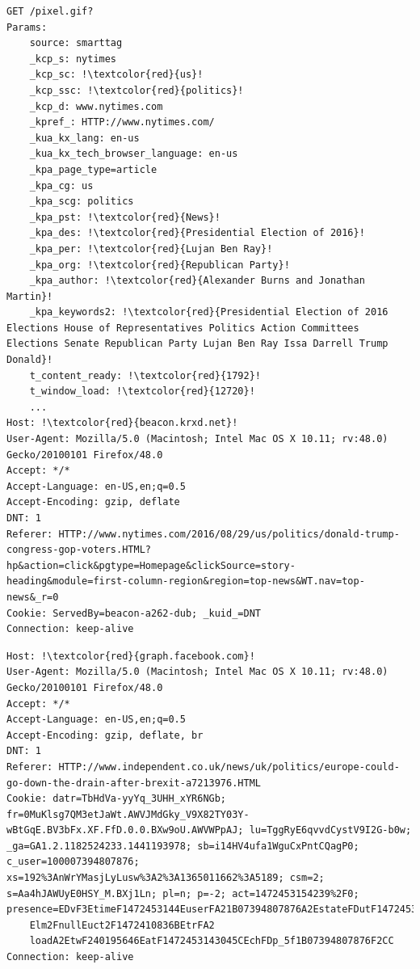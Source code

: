 \begin{lstlisting}[frame=single, breaklines=true, keepspaces=true, basicstyle=\tiny, escapechar=!]
GET /pixel.gif?
Params:
	source: smarttag
	_kcp_s: nytimes
	_kcp_sc: !\textcolor{red}{us}!
	_kcp_ssc: !\textcolor{red}{politics}!
	_kcp_d: www.nytimes.com
	_kpref_: HTTP://www.nytimes.com/
	_kua_kx_lang: en-us
	_kua_kx_tech_browser_language: en-us
	_kpa_page_type=article
	_kpa_cg: us
	_kpa_scg: politics
	_kpa_pst: !\textcolor{red}{News}!
	_kpa_des: !\textcolor{red}{Presidential Election of 2016}!
	_kpa_per: !\textcolor{red}{Lujan Ben Ray}!
	_kpa_org: !\textcolor{red}{Republican Party}!
	_kpa_author: !\textcolor{red}{Alexander Burns and Jonathan Martin}!
	_kpa_keywords2: !\textcolor{red}{Presidential Election of 2016 Elections House of Representatives Politics Action Committees Elections Senate Republican Party Lujan Ben Ray Issa Darrell Trump Donald}!
	t_content_ready: !\textcolor{red}{1792}!
	t_window_load: !\textcolor{red}{12720}!
	...
Host: !\textcolor{red}{beacon.krxd.net}!
User-Agent: Mozilla/5.0 (Macintosh; Intel Mac OS X 10.11; rv:48.0) Gecko/20100101 Firefox/48.0
Accept: */*
Accept-Language: en-US,en;q=0.5
Accept-Encoding: gzip, deflate
DNT: 1
Referer: HTTP://www.nytimes.com/2016/08/29/us/politics/donald-trump-congress-gop-voters.HTML?hp&action=click&pgtype=Homepage&clickSource=story-heading&module=first-column-region&region=top-news&WT.nav=top-news&_r=0
Cookie: ServedBy=beacon-a262-dub; _kuid_=DNT
Connection: keep-alive
\end{lstlisting}

\begin{lstlisting}[frame=single, breaklines=true, keepspaces=true, basicstyle=\tiny, escapechar=!]
Host: !\textcolor{red}{graph.facebook.com}!
User-Agent: Mozilla/5.0 (Macintosh; Intel Mac OS X 10.11; rv:48.0) Gecko/20100101 Firefox/48.0
Accept: */*
Accept-Language: en-US,en;q=0.5
Accept-Encoding: gzip, deflate, br
DNT: 1
Referer: HTTP://www.independent.co.uk/news/uk/politics/europe-could-go-down-the-drain-after-brexit-a7213976.HTML
Cookie: datr=TbHdVa-yyYq_3UHH_xYR6NGb; fr=0MuKlsg7QM3etJaWt.AWVJMdGky_V9X82TY03Y-wBtGqE.BV3bFx.XF.FfD.0.0.BXw9oU.AWVWPpAJ; lu=TggRyE6qvvdCystV9I2G-b0w; _ga=GA1.2.1182524233.1441193978; sb=i14HV4ufa1WguCxPntCQagP0; c_user=100007394807876; xs=192%3AnWrYMasjLyLusw%3A2%3A1365011662%3A5189; csm=2; s=Aa4hJAWUyE0HSY_M.BXj1Ln; pl=n; p=-2; act=1472453154239%2F0; presence=EDvF3EtimeF1472453144EuserFA21B07394807876A2EstateFDutF1472453144216Et2F_5b_5d
    Elm2FnullEuct2F1472410836BEtrFA2
    loadA2EtwF240195646EatF1472453143045CEchFDp_5f1B07394807876F2CC
Connection: keep-alive
\end{lstlisting}

